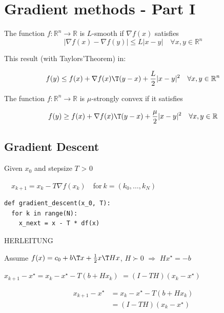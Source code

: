 \section{Gradient methods - Part I}

\begin{definition}[smoothness]
	The function $f : \mathbb{R}^{n}\rightarrow \mathbb{R}$ is $L$-smooth
	if $\nabla f(x)$ satisfies
	\[|\nabla f(x)-\nabla f(y)|\le L|x-y| \quad \forall x,y \in \mathbb{R}^{n}\]
\end{definition}

This result (with Taylors'Theorem) in:

\[f(y)\le f(x)+\nabla f(x)\T (y-x) +\frac{L}{2}|x-y|^2 \quad \forall x,y \in \mathbb{R}^{n}\]

\begin{definition}
	The function $f : \mathbb{R}^{n}\rightarrow \mathbb{R}$ is $\mu$-strongly convex
	if it satisfies

	\[f(y)\ge f(x)+\nabla f(x)\T (y-x) +\frac{\mu}{2}|x-y|^2 \quad \forall x,y \in \mathbb{R}^{}\]
\end{definition}

\subsection{Gradient Descent}

Given $x_0$ and stepsize $T$ > 0

$\quad x_{k+1}=x_k - T\nabla f(x_k)\quad$for$\ k = (k_0,\dots,k_N)$


\begin{verbatim}
def gradient_descent(x_0, T):
  for k in range(N):
    x_next = x - T * df(x)
\end{verbatim}

%

HERLEITUNG

Assume
$f(x)=c_0+b\T x+\frac{1}{2}x\T Hx$,
$H\succ0$
$\Rightarrow$
$Hx^\star =-b$

$x_{k+1}-x^\star=x_k-x^\star-T(b+Hx_k)$
$=(I-TH)(x_k-x^\star)$

\[\begin{aligned}
		x_{k+1}-x^\star & =x_k-x^\star-T(b+Hx_k)
		\\
		                & =(I-TH)(x_k-x^\star)
	\end{aligned}\]

